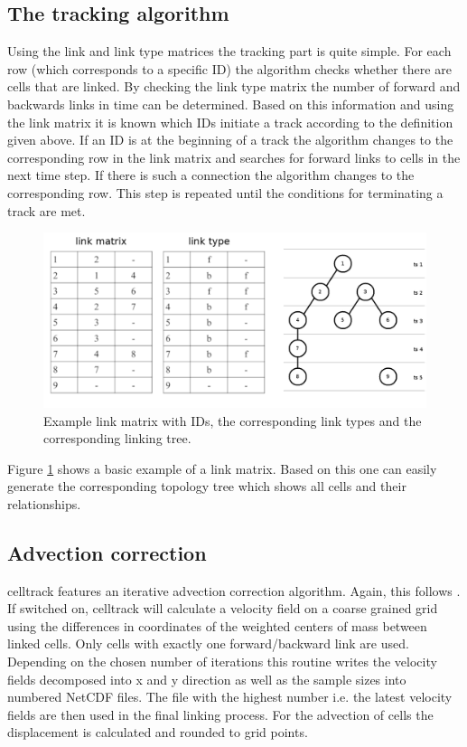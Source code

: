 \documentclass{scrartcl}
\begin{document}
\subsection{The tracking algorithm}
Using the link and link type matrices the tracking part is quite simple. For each row (which corresponds to a specific ID) the algorithm checks whether there are cells that are linked. By checking the link type matrix the number of forward and backwards links in time can be determined. Based on this information and using the link matrix it is known which IDs initiate a track according to the definition given above. If an ID is at the beginning of a track the algorithm changes to the corresponding row in the link matrix and searches for forward links to cells in the next time step. If there is such a connection the algorithm changes to the corresponding row. This step is repeated until the conditions for terminating a track are met.
\begin{figure}[h]
	\centering
	\includegraphics[width=.8\linewidth]{links}
	\caption{Example link matrix with IDs, the corresponding link types and the corresponding linking tree.}
	\label{links}
\end{figure}
Figure \ref{links} shows a basic example of a link matrix. Based on this one can easily generate the corresponding topology tree which shows all cells and their relationships.

\subsection{Advection correction}
celltrack features an iterative advection correction algorithm. Again, this follows \cite{moseley2013}. If switched on, celltrack will calculate a velocity field on a coarse grained grid using the differences in coordinates of the weighted centers of mass between linked cells. Only cells with exactly one forward/backward link are used. Depending on the chosen number of iterations this routine writes the velocity fields decomposed into x and y direction as well as the sample sizes into numbered NetCDF files. The file with the highest number i.e. the latest velocity fields are then used in the final linking process. For the advection of cells the displacement is calculated and rounded to grid points.
\end{document}
